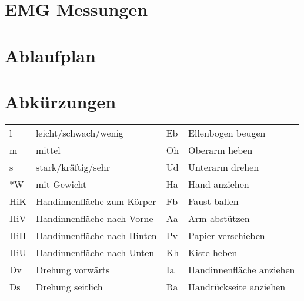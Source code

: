 \documentclass{article}
\begin{document}
\setcounter{run}{-1}

\section*{EMG Messungen}
\vspace{1cm}
\section*{Ablaufplan}

\section*{Abk\"urzungen}
\begin{center}
  \begin{tabular}{ p{}  p{} p{}  p{}}
    l & leicht/schwach/wenig & Eb & Ellenbogen beugen\\
	m & mittel & Oh & Oberarm heben\\
	s & stark/kr\"aftig/sehr & Ud & Unterarm drehen\\
	*W & mit Gewicht & Ha & Hand anziehen\\
	HiK & Handinnenfl\"ache zum K\"orper & Fb & Faust ballen\\
	HiV & Handinnenfl\"ache nach Vorne & Aa & Arm abst\"utzen \\
	HiH & Handinnenfl\"ache nach Hinten & Pv & Papier verschieben \\
	HiU & Handinnenfl\"ache nach Unten & Kh & Kiste heben\\
	Dv & Drehung vorw\"arts& Ia & Handinnenfl\"ache anziehen\\
	Ds & Drehung seitlich & Ra & Handr\"uckseite anziehen
	\end{tabular}
\end{center}
	
	    
    
\end{document}
